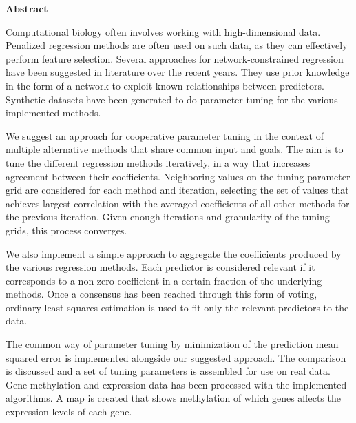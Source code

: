 \newpage
{\Huge \bf Abstract}
\vspace{24pt} 

Computational biology often involves working with high-dimensional data. Penalized regression methods are often used on such data, as they can effectively perform feature selection. Several approaches for network-constrained regression have been suggested in literature over the recent years. They use prior knowledge in the form of a network to exploit known relationships between predictors. Synthetic datasets have been generated to do parameter tuning for the various implemented methods. 

We suggest an approach for cooperative parameter tuning in the context of multiple alternative methods that share common input and goals. The aim is to tune the different regression methods iteratively, in a way that increases agreement between their coefficients. Neighboring values on the tuning parameter grid are considered for each method and iteration, selecting the set of values that achieves largest correlation with the averaged coefficients of all other methods for the previous iteration. Given enough iterations and granularity of the tuning grids, this process converges.

We also implement a simple approach to aggregate the coefficients produced by the various regression methods. Each predictor is considered relevant if it corresponds to a non-zero coefficient in a certain fraction of the underlying methods. Once a consensus has been reached through this form of voting, ordinary least squares estimation is used to fit only the relevant predictors to the data.

The common way of parameter tuning by minimization of the prediction mean squared error is implemented alongside our suggested approach. The comparison is discussed and a set of tuning parameters is assembled for use on real data. Gene methylation and expression data has been processed with the implemented algorithms. A map is created that shows methylation of which genes affects the expression levels of each gene.

\newpage
\vspace*{\fill}
